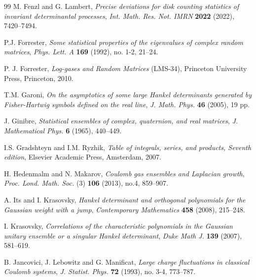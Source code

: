 \documentclass[reqno]{amsart}
\newcommand{\1}{\mathds{1}}
\numberwithin{equation}{section}
\theoremstyle{definition}
\begin{document}
\begin{thebibliography}{99}
 M. Fenzl and G. Lambert, \emph{Precise deviations for disk counting statistics of invariant determinantal processes}, \textit{Int. Math. Res. Not. IMRN} \textbf{2022} (2022), 7420--7494.


 P.J. Forrester, \emph{Some statistical properties of the eigenvalues of complex random matrices}, \textit{Phys. Lett. A} \textbf{169} (1992), no. 1-2, 21--24. 

P. J. Forrester, \emph{Log-gases and Random Matrices} (LMS-34), Princeton University Press, Princeton, 2010.

 T.M. Garoni, \emph{On the asymptotics of some large Hankel determinants generated by Fisher-Hartwig symbols defined on the real line}, \textit{J. Math. Phys.} \textbf{46} (2005), 19 pp.

 J. Ginibre, \emph{Statistical ensembles of complex, quaternion, and real matrices}, \textit{J. Mathematical Phys.} \textbf{6} (1965), 440--449. 




 I.S. Gradshteyn and I.M. Ryzhik, \emph{Table of integrals, series, and products, Seventh edition}, Elsevier Academic Press, Amsterdam, 2007.


 H. Hedenmalm and N. Makarov, \textit{Coulomb gas ensembles and Laplacian growth}, \textit{Proc. Lond. Math. Soc.} (3) \textbf{106} (2013), no.4, 859--907.

 A. Its and I. Krasovsky, \emph{Hankel determinant and orthogonal polynomials for the Gaussian weight with a jump}, \textit{Contemporary Mathematics} \textbf{458} (2008), 215--248.


 I. Krasovsky, \emph{Correlations of the characteristic polynomials in the Gaussian unitary ensemble or a singular Hankel determinant}, \textit{Duke Math J.} \textbf{139} (2007), 581--619. 


 B. Jancovici, J. Lebowitz and G. Manificat, \emph{Large charge fluctuations in classical Coulomb systems}, \textit{J. Statist. Phys.} \textbf{72} (1993), no. 3-4, 773--787.








\end{thebibliography}
\end{document}
